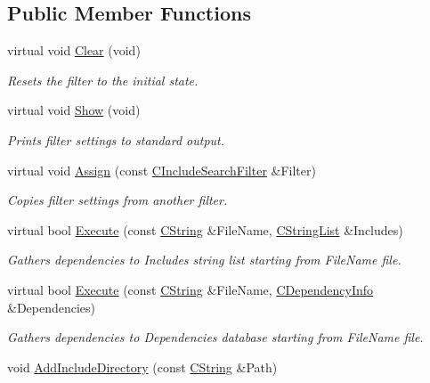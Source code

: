 \subsection*{Public Member Functions}
\begin{DoxyCompactItemize}
\item 
virtual void \hyperlink{classCIncludeSearchFilter_a5effffa7de380a06feab27bdfde177a5}{Clear} (void)
\begin{DoxyCompactList}\small\item\em Resets the filter to the initial state. \end{DoxyCompactList}\item 
virtual void \hyperlink{classCIncludeSearchFilter_aa40e9e57c931219ab680beff78babb40}{Show} (void)
\begin{DoxyCompactList}\small\item\em Prints filter settings to standard output. \end{DoxyCompactList}\item 
virtual void \hyperlink{classCIncludeSearchFilter_adf262663be6dd431f048c61817ecb07a}{Assign} (const \hyperlink{classCIncludeSearchFilter}{C\-Include\-Search\-Filter} \&Filter)
\begin{DoxyCompactList}\small\item\em Copies filter settings from another filter. \end{DoxyCompactList}\item 
virtual bool \hyperlink{classCIncludeSearchFilter_a2b30667171e75cd5721e97b54eeb9182}{Execute} (const \hyperlink{classCString}{C\-String} \&File\-Name, \hyperlink{classCStringList}{C\-String\-List} \&Includes)
\begin{DoxyCompactList}\small\item\em Gathers dependencies to {\itshape Includes} string list starting from {\itshape File\-Name} file. \end{DoxyCompactList}\item 
virtual bool \hyperlink{classCIncludeSearchFilter_aa43b2d4b8f62c9d695490d5cd072c3bc}{Execute} (const \hyperlink{classCString}{C\-String} \&File\-Name, \hyperlink{classCDependencyInfo}{C\-Dependency\-Info} \&Dependencies)
\begin{DoxyCompactList}\small\item\em Gathers dependencies to {\itshape Dependencies} database starting from {\itshape File\-Name} file. \end{DoxyCompactList}\item 
void \hyperlink{classCIncludeSearchFilter_a5716c9dc6d07feaeeaab44a7fe65bdcb}{Add\-Include\-Directory} (const \hyperlink{classCString}{C\-String} \&Path)

\end{DoxyCompactItemize}
